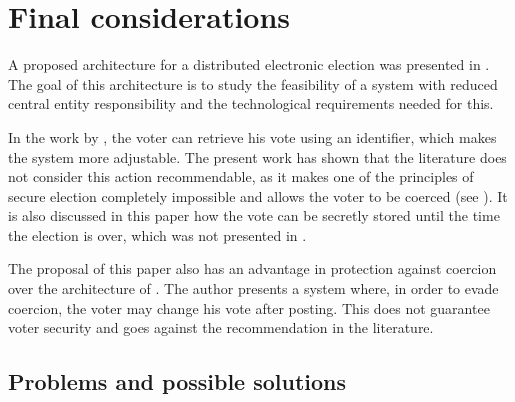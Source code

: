 \documentclass[english]{textolivre}
\begin{document}


\section{Final considerations \label{sec-final}}

A proposed architecture for a distributed electronic election was presented in . The goal of this architecture is to study the feasibility of a system with reduced central entity responsibility and the technological requirements needed for this.

In the work by \textcite{hjal}, the voter can retrieve his vote using an identifier, which makes the system more adjustable. The present work has shown that the literature does not consider this action recommendable, as it makes one of the principles of secure election completely impossible and allows the voter to be coerced (see ). It is also discussed in this paper how the vote can be secretly stored until the time the election is over, which was not presented in \textcite{hjal}.

The proposal of this paper also has an advantage in protection against coercion over the architecture of \textcite{Hardwick}. The author presents a system where, in order to evade coercion, the voter may change his vote after posting. This does not guarantee voter security and goes against the recommendation in the literature.

\subsection{Problems and possible solutions \label{sec-problems}}
\end{document}
